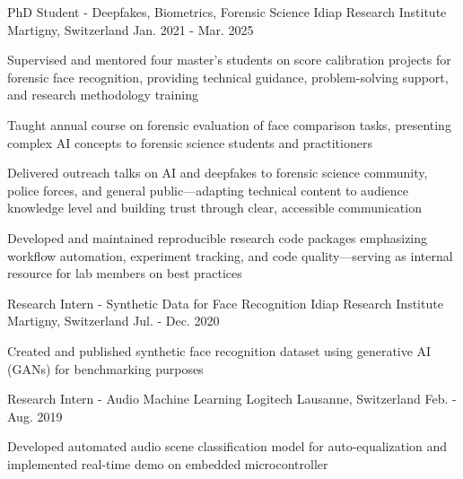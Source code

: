 \begin{cventries}
  \cventry
    {PhD Student - Deepfakes, Biometrics, Forensic Science} %
    {Idiap Research Institute} %
    {Martigny, Switzerland} %
    {Jan. 2021 - Mar. 2025} %
    {
      \begin{cvitems} %
        \item {Supervised and mentored four master's students on score calibration projects for forensic face recognition, providing technical guidance, problem-solving support, and research methodology training}
        \item {Taught annual course on forensic evaluation of face comparison tasks, presenting complex AI concepts to forensic science students and practitioners}
        \item {Delivered outreach talks on AI and deepfakes to forensic science community, police forces, and general public—adapting technical content to audience knowledge level and building trust through clear, accessible communication}
        \item {Developed and maintained reproducible research code packages emphasizing workflow automation, experiment tracking, and code quality—serving as internal resource for lab members on best practices}
      \end{cvitems}
    }

  \cventry
    {Research Intern - Synthetic Data for Face Recognition} %
    {Idiap Research Institute} %
    {Martigny, Switzerland} %
    {Jul. - Dec. 2020} %
    {
      \begin{cvitems} %
        \item {Created and published synthetic face recognition dataset using generative AI (GANs) for benchmarking purposes}
      \end{cvitems}
    }

  \cventry
    {Research Intern - Audio Machine Learning} %
    {Logitech} %
    {Lausanne, Switzerland} %
    {Feb. - Aug. 2019} %
    {
      \begin{cvitems} %
        \item {Developed automated audio scene classification model for auto-equalization and implemented real-time demo on embedded microcontroller}
      \end{cvitems}
    }

\end{cventries}
